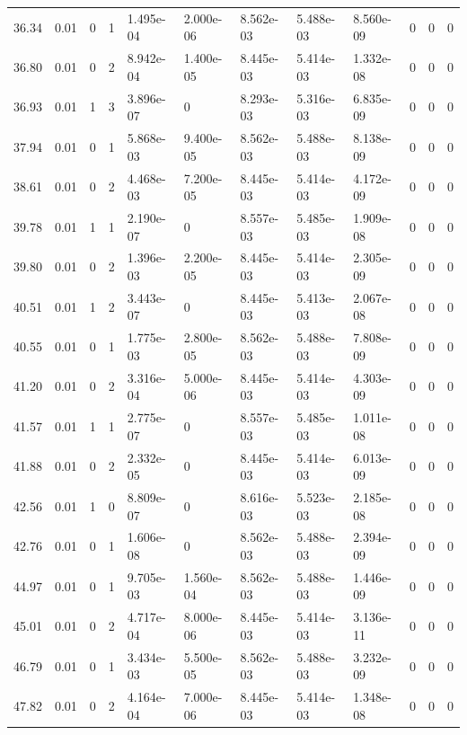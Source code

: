 \documentclass[preview]{standalone}
\begin{document}
{{{\begin{tabular}{L{1.2cm}C{1.2cm} C{0.3cm}C{0.5cm} C{1.4cm}C{1.4cm} C{1.4cm}C{1.4cm} C{1.6cm}C{1.6cm} C{1.6cm}C{1.6cm}}
  36.34  &  0.01  & 0     &  1 &  1.495e-04  & 2.000e-06  &  8.562e-03&   5.488e-03& 8.560e-09 & 0   &  0 & 0  \\ 
  36.80  &  0.01  & 0     &  2 &  8.942e-04  & 1.400e-05  &  8.445e-03&   5.414e-03& 1.332e-08 & 0   &  0 & 0  \\ 
  36.93  &  0.01  & 1     &  3 &  3.896e-07  & 0  &  8.293e-03&   5.316e-03& 6.835e-09 & 0   &  0 & 0  \\ 
  37.94  &  0.01  & 0     &  1 &  5.868e-03  & 9.400e-05  &  8.562e-03&   5.488e-03& 8.138e-09 & 0   &  0 & 0  \\ 
  38.61  &  0.01  & 0     &  2 &  4.468e-03  & 7.200e-05  &  8.445e-03&   5.414e-03& 4.172e-09 & 0   &  0 & 0  \\ 
  39.78  &  0.01  & 1     &  1 &  2.190e-07  & 0  &  8.557e-03&   5.485e-03& 1.909e-08 & 0   &  0 & 0  \\ 
  39.80  &  0.01  & 0     &  2 &  1.396e-03  & 2.200e-05  &  8.445e-03&   5.414e-03& 2.305e-09 & 0   &  0 & 0  \\ 
  40.51  &  0.01  & 1     &  2 &  3.443e-07  & 0  &  8.445e-03&   5.413e-03& 2.067e-08 & 0   &  0 & 0  \\ 
  40.55  &  0.01  & 0     &  1 &  1.775e-03  & 2.800e-05  &  8.562e-03&   5.488e-03& 7.808e-09 & 0   &  0 & 0  \\ 
  41.20  &  0.01  & 0     &  2 &  3.316e-04  & 5.000e-06  &  8.445e-03&   5.414e-03& 4.303e-09 & 0   &  0 & 0  \\ 
  41.57  &  0.01  & 1     &  1 &  2.775e-07  & 0  &  8.557e-03&   5.485e-03& 1.011e-08 & 0   &  0 & 0  \\ 
  41.88  &  0.01  & 0     &  2 &  2.332e-05  & 0  &  8.445e-03&   5.414e-03& 6.013e-09 & 0   &  0 & 0  \\ 
  42.56  &  0.01  & 1     &  0 &  8.809e-07  & 0  &  8.616e-03&   5.523e-03& 2.185e-08 & 0   &  0 & 0  \\ 
  42.76  &  0.01  & 0     &  1 &  1.606e-08  & 0  &  8.562e-03&   5.488e-03& 2.394e-09 & 0   &  0 & 0  \\ 
  44.97  &  0.01  & 0     &  1 &  9.705e-03  & 1.560e-04  &  8.562e-03&   5.488e-03& 1.446e-09 & 0   &  0 & 0  \\ 
  45.01  &  0.01  & 0     &  2 &  4.717e-04  & 8.000e-06  &  8.445e-03&   5.414e-03& 3.136e-11 & 0   &  0 & 0  \\ 
  46.79  &  0.01  & 0     &  1 &  3.434e-03  & 5.500e-05  &  8.562e-03&   5.488e-03& 3.232e-09 & 0   &  0 & 0  \\ 
  47.82  &  0.01  & 0     &  2 &  4.164e-04  & 7.000e-06  &  8.445e-03&   5.414e-03& 1.348e-08 & 0   &  0 & 0  \\ 

\end{tabular}}}}
\end{document}
